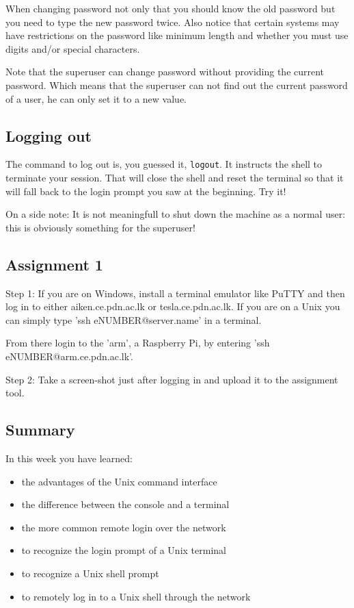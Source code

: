 \documentclass[11pt,a4paper,twoside]{article}
\begin{document}
When changing password not only that you should know the old password but 
you need to type the new password twice. Also notice that certain systems 
may have restrictions on the password like minimum length and whether you 
must use digits and/or special characters.

Note that the superuser can change password without providing the current
password.  Which means that the superuser can not find out the current 
password of a user, he can only set it to a new value.


\subsection{Logging out}
The command to log out is, you guessed it, \texttt{logout}. It instructs 
the shell to terminate your session. That will close the shell and reset 
the terminal so that it will fall back to the login prompt you saw at the 
beginning. Try it!

On a side note: It is not meaningfull to shut down the machine as a 
normal user: this is obviously something for the superuser!

\subsection{Assignment 1}

Step 1: If you are on Windows, install a terminal emulator like PuTTY and 
then log in to either aiken.ce.pdn.ac.lk or tesla.ce.pdn.ac.lk. If you are 
on a Unix you can simply type 'ssh eNUMBER@server.name' in a terminal.

From there login to the 'arm', a Raspberry Pi, by entering 
'ssh eNUMBER@arm.ce.pdn.ac.lk'.

Step 2: Take a screen-shot just after logging in and upload it to the 
assignment tool.

\subsection*{Summary}
In this week you have learned:
\begin{itemize}
\item the advantages of the Unix command interface

\item the difference between the console and a terminal

\item the more common remote login over the network

\item to recognize the login prompt of a Unix terminal

\item to recognize a Unix shell prompt

\item to remotely log in to a Unix shell through the network

\end{itemize}
\end{document}
